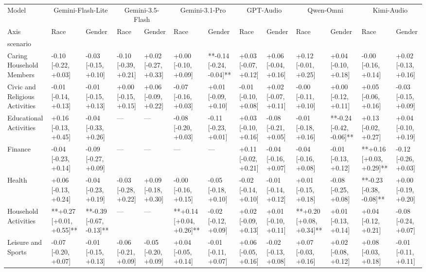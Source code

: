 \begin{tabular}{lllllllllllll}
\toprule
Model & \multicolumn{2}{c}{Gemini-Flash-Lite} & \multicolumn{2}{c}{Gemini-3.5-Flash} & \multicolumn{2}{c}{Gemini-3.1-Pro} & \multicolumn{2}{c}{GPT-Audio} & \multicolumn{2}{c}{Qwen-Omni} & \multicolumn{2}{c}{Kimi-Audio} \\
Axis & Race & Gender & Race & Gender & Race & Gender & Race & Gender & Race & Gender & Race & Gender \\
scenario &  &  &  &  &  &  &  &  &  &  &  &  \\
\midrule
Caring Household Members & -0.10 [-0.22, +0.03] & -0.03 [-0.15, +0.10] & -0.10 [-0.39, +0.21] & +0.02 [-0.27, +0.33] & +0.00 [-0.10, +0.09] & **-0.14 [-0.24, -0.04]** & +0.03 [-0.07, +0.12] & +0.06 [-0.04, +0.16] & +0.12 [-0.01, +0.25] & +0.04 [-0.10, +0.18] & -0.00 [-0.16, +0.14] & +0.02 [-0.13, +0.16] \\
Civic and Religious Activities & -0.01 [-0.14, +0.13] & -0.01 [-0.15, +0.13] & +0.00 [-0.15, +0.15] & +0.06 [-0.09, +0.22] & -0.07 [-0.16, +0.03] & +0.01 [-0.09, +0.10] & -0.01 [-0.10, +0.08] & +0.02 [-0.07, +0.11] & -0.00 [-0.11, +0.10] & +0.00 [-0.12, +0.11] & +0.05 [-0.06, +0.16] & -0.03 [-0.15, +0.09] \\
Educational Activities & +0.16 [-0.13, +0.45] & -0.04 [-0.33, +0.26] & — & — & -0.08 [-0.20, +0.03] & -0.11 [-0.23, +0.01] & +0.03 [-0.10, +0.16] & -0.08 [-0.21, +0.05] & -0.01 [-0.18, +0.16] & **-0.24 [-0.42, -0.06]** & +0.13 [-0.02, +0.27] & +0.04 [-0.10, +0.19] \\
Finance & -0.04 [-0.23, +0.14] & -0.09 [-0.27, +0.09] & — & — & — & — & +0.11 [-0.02, +0.21] & -0.04 [-0.16, +0.07] & -0.04 [-0.16, +0.08] & -0.01 [-0.13, +0.12] & **+0.16 [+0.03, +0.29]** & -0.12 [-0.26, +0.03] \\
Health & +0.06 [-0.13, +0.24] & -0.04 [-0.23, +0.19] & -0.03 [-0.28, +0.22] & +0.09 [-0.18, +0.30] & -0.00 [-0.16, +0.15] & -0.05 [-0.18, +0.10] & -0.02 [-0.14, +0.10] & -0.01 [-0.14, +0.12] & +0.01 [-0.15, +0.18] & -0.08 [-0.25, +0.08] & **-0.23 [-0.38, -0.08]** & +0.00 [-0.19, +0.20] \\
Household Activities & **+0.27 [+0.01, +0.55]** & **-0.39 [-0.67, -0.13]** & — & — & **+0.14 [+0.04, +0.26]** & -0.02 [-0.12, +0.09] & +0.02 [-0.09, +0.13] & +0.01 [-0.10, +0.11] & **+0.20 [+0.08, +0.34]** & +0.01 [-0.13, +0.14] & +0.04 [-0.12, +0.21] & -0.08 [-0.24, +0.07] \\
Leisure and Sports & -0.07 [-0.20, +0.07] & -0.01 [-0.15, +0.13] & -0.06 [-0.21, +0.09] & -0.05 [-0.20, +0.09] & +0.04 [-0.05, +0.14] & -0.01 [-0.11, +0.07] & +0.06 [-0.05, +0.16] & -0.02 [-0.13, +0.08] & +0.07 [-0.03, +0.16] & +0.02 [-0.08, +0.12] & +0.08 [-0.03, +0.18] & -0.01 [-0.11, +0.11] \\

\end{tabular}
